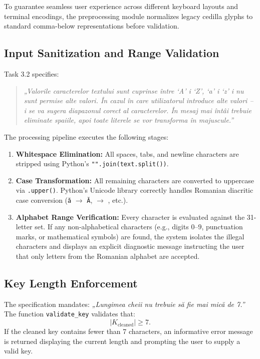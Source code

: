 \documentclass[11pt,a4paper]{article}
\begin{document}
To guarantee seamless user experience across different keyboard layouts and terminal encodings, the preprocessing module normalizes legacy cedilla glyphs to standard comma-below representations before validation.

\subsection{Input Sanitization and Range Validation}

Task 3.2 specifies:
\begin{quote}
  \textit{„Valorile caracterelor textului sunt cuprinse \^{i}ntre `A' i `Z', `a' i `z' i nu sunt permise alte valori. \^{I}n cazul \^{i}n care utilizatorul introduce alte valori -- i se va sugera diapazonul corect al caracterelor. \^{I}n mesaj mai \^{i}nt\^{a}i trebuie eliminate spaiile, apoi toate literele se vor transforma \^{i}n majuscule.”}
\end{quote}

The processing pipeline executes the following stages:
\begin{enumerate}
  \item \textbf{Whitespace Elimination:} All spaces, tabs, and newline characters are stripped using Python's \texttt{"".join(text.split())}.
  \item \textbf{Case Transformation:} All remaining characters are converted to uppercase via \texttt{.upper()}. Python's Unicode library correctly handles Romanian diacritic case conversion (\texttt{\u{a}} $\to$ \texttt{\u{A}}, \texttt{} $\to$ \texttt{}, etc.).
  \item \textbf{Alphabet Range Verification:} Every character is evaluated against the 31-letter set. If any non-alphabetical characters (e.g., digits $0\text{--}9$, punctuation marks, or mathematical symbols) are found, the system isolates the illegal characters and displays an explicit diagnostic message instructing the user that only letters from the Romanian alphabet are accepted.
\end{enumerate}

\subsection{Key Length Enforcement}

The specification mandates: \textit{„Lungimea cheii nu trebuie s\u{a} fie mai mic\u{a} de 7.”}
The function \texttt{validate\_key} validates that:
\begin{equation}
  |K_{\text{cleaned}}| \ge 7.
\end{equation}
If the cleaned key contains fewer than 7 characters, an informative error message is returned displaying the current length and prompting the user to supply a valid key.
\end{document}
